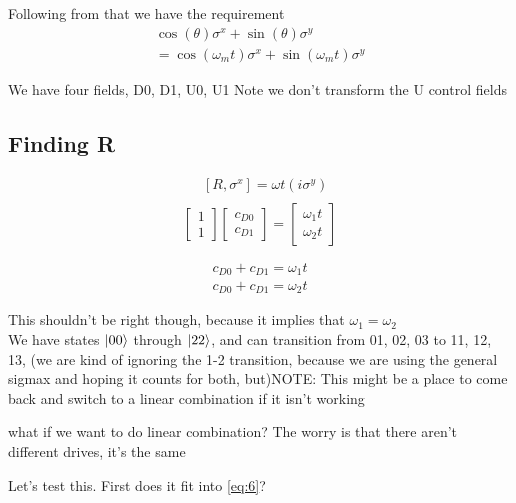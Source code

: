 \documentclass[12pt]{article}
\begin{document}
Following from that we have the requirement
\begin{equation}
    \begin{split}
        \cos(\theta) \sigma^x + \sin(\theta) \sigma^y\\
        = \cos(\omega_m t) \sigma^x + \sin(\omega_m t) \sigma^y
    \end{split}
\end{equation}


We have four fields, D0, D1, U0, U1
Note we don't transform the U control fields
\subsection{Finding R}
\begin{align}
   &[R, \sigma^x] = \omega t (i \sigma^y) \\
\end{align}
\begin{equation}
    \begin{bmatrix}
        1 \\
        1
    \end{bmatrix}
    \begin{bmatrix}
        c_{D0} \\
        c_{D1}
    \end{bmatrix}
     =
    \begin{bmatrix}
        \omega_1 t \\
        \omega_2 t
    \end{bmatrix}
\end{equation}

\begin{align}
    c_{D0} + c_{D1} = \omega_1 t\\
    c_{D0} + c_{D1} = \omega_2 t
\end{align}

This shouldn't be right though, because it implies that $\omega_1 = \omega_2$\\

We have states $\ket{00}$ through $\ket{22}$, and can transition from 01, 02, 03
to 11, 12, 13, (we are kind of ignoring the 1-2 transition, because we are using
the general sigmax and hoping it counts for both, but)NOTE: This might be a
place to come back and switch to a linear combination if it isn't working

what if we want to do linear combination? The worry is that there aren't
different drives, it's the same 

Let's test this. First does it fit into \eqref{eq:6}?
\end{document}
